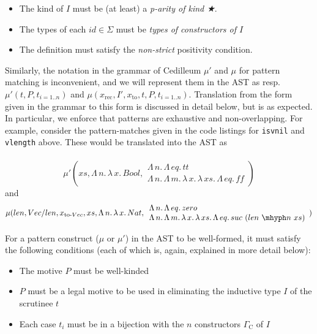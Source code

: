 \documentclass{article}
\newcommand{\absu}[3]{{#1}\, #2.\, #3}
\begin{document}
\begin{itemize}
\item The kind of $I$ must be (at least) a \textit{p-arity of kind ★}.
\item The types of each $id \in \Sigma$ must be \textit{types of constructors
    of $I$}
\item The definition must satisfy the \textit{non-strict} positivity condition.
\end{itemize}

Similarly, the notation in the grammar of Cedilleum $\mu'$ and $\mu$ for pattern
matching is inconvenient, and we will represent them in the AST as resp.
$\mu'(t,P,t_{i=1..n})$ and
$\mu(x_{\text{rec}},I',x_{\text{to}},t,P,t_{i=1..n})$. Translation from the form
given in the grammar to this form is discussed in detail below, but is as
expected. In particular, we enforce that patterns are exhaustive and
non-overlapping. For example, consider the pattern-matches given in the code listings
for \texttt{isvnil} and \texttt{vlength} above. These would be translated into
the AST as
\\ \\
\[
  \mu'(xs,\absu{\Lambda}{n}{\absu{\lambda}{x}{Bool}},
  \begin{array}{l}
    \absu{\Lambda}{n}{\absu{\Lambda}{eq}{tt}}
    \\ \absu{\Lambda}{n}{\absu{\Lambda}{m}{\absu{\lambda}{x}{\absu{\lambda}{xs}{\absu{\Lambda}{eq}{ff}}}}}
  \end{array}
  )
\] and
\[ \mu(len, Vec/len, x_{\text{to-}Vec},xs,\absu{\Lambda}{n}{\absu{\lambda}{x}{Nat}},
  \begin{array}{l}
    \absu{\Lambda}{n}{\absu{\Lambda}{eq}{zero}}
    \\ \absu{\Lambda}{n}{\absu{\Lambda}{m}{\absu{\lambda}{x}{\absu{\lambda}{xs}{\absu{\Lambda}{eq}{suc\
    (len\ \mhyph n\ xs)}}}}}
  \end{array})
\]

For a pattern construct ($\mu$ or $\mu'$) in the AST to be well-formed, it must satisfy the
following conditions (each of which is, again, explained in more detail below):

\begin{itemize}
\item The motive $P$ must be well-kinded
\item $P$ must be a legal motive to be used in eliminating the inductive type
  $I$ of the scrutinee $t$
\item Each case $t_i$ must be in a bijection with the $n$ constructors
  $\Gamma_{\text{C}}$ of $I$
\end{itemize}
\end{document}
